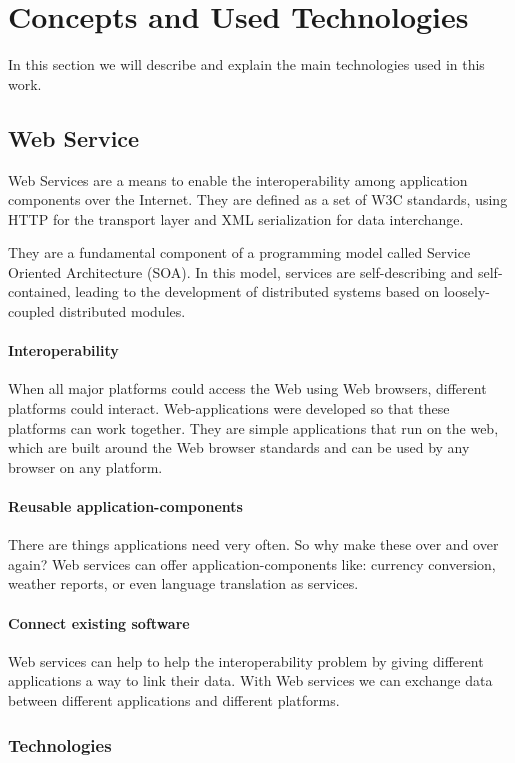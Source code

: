 \section{Concepts and Used Technologies}
In this section we will describe and explain the main technologies used in this work.

\subsection{Web Service}
Web Services are a means to enable the interoperability among application components over the Internet.  They are defined as a set of W3C standards, using HTTP for the transport layer and XML serialization for data interchange.

They are  a fundamental component of a programming model called Service Oriented Architecture (SOA). In this model, services are self-describing and self-contained, leading to the development of distributed systems based on loosely-coupled distributed modules.

\paragraph{Interoperability}
When all major platforms could access the Web using Web browsers, different platforms could interact. Web-applications were developed so that these platforms can work together. They are simple applications that run on the web, which are built around the Web browser standards and can be used by any browser on any platform.

\paragraph{Reusable application-components}
There are things applications need very often. So why make these over and over again? Web services can offer application-components like: currency conversion, weather reports, or even language translation as services.

\paragraph{Connect existing software}
Web services can help to help the interoperability problem by giving different applications a way to link their data. With Web services we can exchange data between different applications and different platforms. \citep{WST}

\subsubsection{Technologies}


